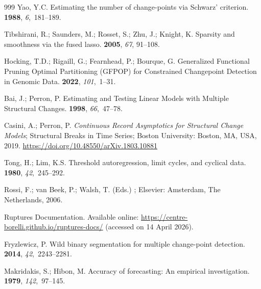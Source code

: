 \documentclass[mathematics,article,accept,pdftex,moreauthors]{Definitions/mdpi}
\begin{document}
\begin{thebibliography}{999}
Yao, Y.C.
\newblock Estimating the number of change-points via Schwarz' criterion.
 {\bf 1988}, {\em
  6},~181--189.

Tibshirani, R.; Saunders, M.; Rosset, S.; Zhu, J.; Knight, K.
\newblock Sparsity and smoothness via the fused lasso.
 {\bf 2005}, \textit{67}, 91--108.

Hocking, T.D.; Rigaill, G.; Fearnhead, P.; Bourque, G.
\newblock Generalized Functional Pruning Optimal Partitioning (GFPOP) for
  Constrained Changepoint Detection in Genomic Data.
 {\bf 2022}, {\em 101},~1–31.

Bai, J.; Perron, P.
\newblock Estimating and Testing Linear Models with Multiple Structural
  Changes.
 {\bf 1998}, {\em 66},~47--78.

Casini, A.; Perron, P. \textit{Continuous Record Asymptotics for Structural Change Models}; Structural Breaks in Time Series; Boston University: Boston, MA, USA, 2019.
\newblock \url{https://doi.org/10.48550/arXiv.1803.10881}

Tong, H.; Lim, K.S.
\newblock Threshold autoregression, limit cycles, and cyclical data.
 {\bf 1980}, {\em 42},~245–292.

Rossi, F.; van Beek, P.; Walsh, T. (Eds.)
; Elsevier: Amsterdam, The Netherlands, 2006.

Ruptures Documentation.  Available online: 
\newblock \url{https://centre-borelli.github.io/ruptures-docs/}  (accessed on 14 April 2026).

Fryzlewicz, P.
\newblock Wild binary segmentation for multiple change-point detection.
 {\bf 2014}, {\em 42},~2243--2281.

Makridakis, S.; Hibon, M.
\newblock Accuracy of forecasting: An empirical investigation.
 {\bf 1979},
  {\em 142},~97--145.

\end{thebibliography}

\PublishersNote{}
\isPreprints{}{%
\end{adjustwidth}
} %
\end{document}
